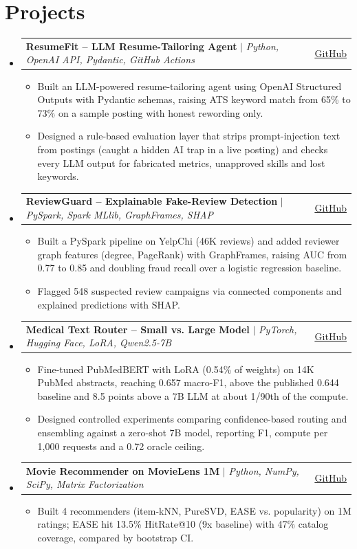 \documentclass[letterpaper,11pt]{article}
\makeatletter
\newcommand{\resumeItem}[1]{\item\small{{#1 \vspace{-3pt}}}}
\newcommand{\resumeProjectHeading}[2]{
    \item
    \begin{tabular*}{0.97\textwidth}{l@{\extracolsep{\fill}}r}
      \small#1 & #2 \\
    \end{tabular*}\vspace{-7pt}
}
\newcommand{\resumeSubHeadingListStart}{\begin{itemize}[leftmargin=0.15in, label={}]}
\newcommand{\resumeSubHeadingListEnd}{\end{itemize}}
\newcommand{\resumeItemListStart}{\begin{itemize}[itemsep=0pt,topsep=4pt,parsep=0pt]}
\newcommand{\resumeItemListEnd}{\end{itemize}\vspace{-5pt}}
\makeatother
\begin{document}
\section{Projects}
    \resumeSubHeadingListStart
      \resumeProjectHeading
          {\textbf{ResumeFit -- LLM Resume-Tailoring Agent} $|$ \emph{Python, OpenAI API, Pydantic, GitHub Actions}}{\href{https://github.com/siri780/resumefit}{\underline{GitHub}}}
          \resumeItemListStart
            \resumeItem{Built an LLM-powered resume-tailoring agent using OpenAI Structured Outputs with Pydantic schemas, raising ATS keyword match from 65\% to 73\% on a sample posting with honest rewording only.}
            \resumeItem{Designed a rule-based evaluation layer that strips prompt-injection text from postings (caught a hidden AI trap in a live posting) and checks every LLM output for fabricated metrics, unapproved skills and lost keywords.}
          \resumeItemListEnd
      \resumeProjectHeading
          {\textbf{ReviewGuard -- Explainable Fake-Review Detection} $|$ \emph{PySpark, Spark MLlib, GraphFrames, SHAP}}{\href{https://github.com/siri780/reviewguard}{\underline{GitHub}}}
          \resumeItemListStart
            \resumeItem{Built a PySpark pipeline on YelpChi (46K reviews) and added reviewer graph features (degree, PageRank) with GraphFrames, raising AUC from 0.77 to 0.85 and doubling fraud recall over a logistic regression baseline.}
            \resumeItem{Flagged 548 suspected review campaigns via connected components and explained predictions with SHAP.}
          \resumeItemListEnd
      \resumeProjectHeading
          {\textbf{Medical Text Router -- Small vs. Large Model} $|$ \emph{PyTorch, Hugging Face, LoRA, Qwen2.5-7B}}{\href{https://github.com/siri780/medical-text-router}{\underline{GitHub}}}
          \resumeItemListStart
            \resumeItem{Fine-tuned PubMedBERT with LoRA (0.54\% of weights) on 14K PubMed abstracts, reaching 0.657 macro-F1, above the published 0.644 baseline and 8.5 points above a 7B LLM at about 1/90th of the compute.}
            \resumeItem{Designed controlled experiments comparing confidence-based routing and ensembling against a zero-shot 7B model, reporting F1, compute per 1,000 requests and a 0.72 oracle ceiling.}
          \resumeItemListEnd
      \resumeProjectHeading
          {\textbf{Movie Recommender on MovieLens 1M} $|$ \emph{Python, NumPy, SciPy, Matrix Factorization}}{\href{https://github.com/siri780/movielens-recommender}{\underline{GitHub}}}
          \resumeItemListStart
            \resumeItem{Built 4 recommenders (item-kNN, PureSVD, EASE vs. popularity) on 1M ratings; EASE hit 13.5\% HitRate@10 (9x baseline) with 47\% catalog coverage, compared by bootstrap CI.}
          \resumeItemListEnd
    \resumeSubHeadingListEnd
\end{document}
